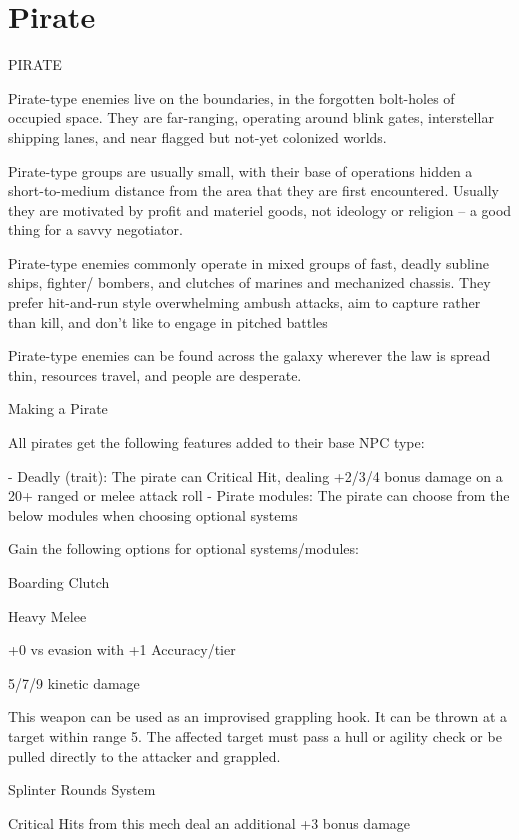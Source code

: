 \section{Pirate}

                                                   PIRATE

Pirate-type enemies live on the boundaries, in the forgotten bolt-holes of occupied space. They
are far-ranging, operating around blink gates, interstellar shipping lanes, and near flagged but
not-yet colonized worlds.

Pirate-type groups are usually small, with their base of operations hidden a short-to-medium
distance from the area that they are first encountered. Usually they are motivated by profit and
materiel goods, not ideology or religion -- a good thing for a savvy negotiator.

Pirate-type enemies commonly operate in mixed groups of fast, deadly subline ships, fighter/
bombers, and clutches of marines and mechanized chassis. They prefer hit-and-run style
overwhelming ambush attacks, aim to capture rather than kill, and don’t like to engage in pitched
battles


Pirate-type enemies can be found across the galaxy wherever the law is spread thin, resources
travel, and people are desperate.

Making a Pirate

All pirates get the following features added to their base NPC type:

    -    Deadly (trait): The pirate can Critical Hit, dealing +2/3/4 bonus damage on a 20+ ranged
         or melee attack roll
    -    Pirate modules: The pirate can choose from the below modules when choosing optional
         systems

Gain the following options for optional systems/modules:


Boarding Clutch

Heavy Melee

+0 vs evasion with +1 Accuracy/tier

5/7/9 kinetic damage

This weapon can be used as an improvised grappling hook. It can be thrown at a target within
range 5. The affected target must pass a hull or agility check or be pulled directly to the attacker
and grappled.


Splinter Rounds
System

Critical Hits from this mech deal an additional +3 bonus damage


